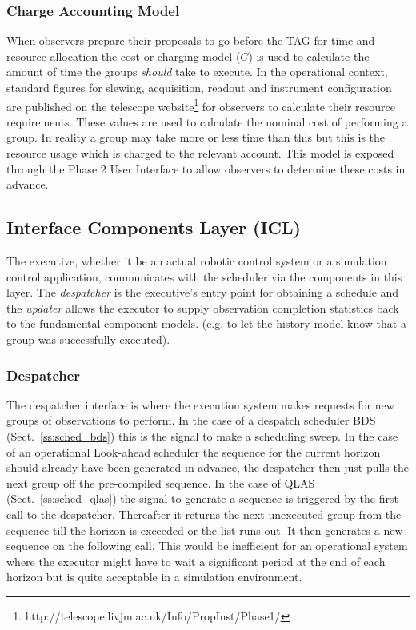 \subsubsection{Charge Accounting Model}
When observers prepare their proposals to go before the TAG for time and resource allocation the cost or charging model ($C$) is  used to calculate the amount of time the groups \emph{should} take to execute. In the operational context, standard figures for slewing, acquisition, readout and instrument configuration are published on the telescope website\footnote{http://telescope.livjm.ac.uk/Info/PropInst/Phase1/} for observers to calculate their resource requirements. These values are used to calculate the nominal cost of performing a group. In reality a group may take more or less time than this but this is the resource usage which is charged to the relevant account. This model is exposed through the Phase 2 User Interface to allow observers to determine these costs in advance.


\subsection{Interface Components Layer (ICL)} 
The executive, whether it be an actual robotic control system or a simulation control application, communicates with the scheduler via the components in this layer. The \emph{despatcher} is the executive's entry point for obtaining a schedule and the \emph{updater} allows the executor to supply observation completion statistics back to the fundamental component models. (e.g. to let the history model know that a group was successfully executed).

\subsubsection{Despatcher}
The despatcher interface is where the execution system makes requests for new groups of observations to perform. In the case of a despatch scheduler BDS (Sect.~\ref{ss:sched_bds}) this is the signal to make a scheduling sweep. In the case of an operational Look-ahead scheduler the sequence for the current horizon should already have been generated in advance, the despatcher then just pulls the next group off the pre-compiled sequence. In the case of QLAS (Sect.~\ref{ss:sched_qlas}) the signal to generate a sequence is triggered by the first call to the despatcher. Thereafter it returns the next unexecuted group from the sequence till the horizon is exceeded or the list runs out. It then generates a new sequence on the following call. This would be inefficient for an operational system where the executor might have to wait a significant period at the end of each horizon but is quite acceptable in a simulation environment.

